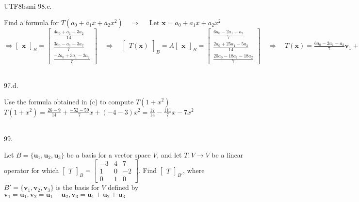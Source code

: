 \documentclass[12pt]{book}
\begin{document}
\begin{CJK}{UTF8}{bsmi}
98.c. \begin{minipage}[t]{\dimexpr\linewidth-2em}
Find a formula for $T(a_0+a_1x+a_2x^2)\quad\Rightarrow\quad$ Let $\textbf{x}=a_0+a_1x+a_2x^2$ \\
$\Rightarrow\begin{bmatrix}
\textbf{x}
\end{bmatrix}_B=\begin{bmatrix}
\frac{4a_0+a_1-3a_2}{14} \\
\frac{3a_0-a_1+3a_2}{7} \\
\frac{-2a_0+3a_1-2a_2}{7}
\end{bmatrix}\quad\Rightarrow\quad\begin{bmatrix}
T(\textbf{x})
\end{bmatrix}_B=A\begin{bmatrix}
\textbf{x}
\end{bmatrix}_B=\begin{bmatrix}
\frac{6a_0-2a_1-a_2}{7} \\
\frac{2a_0+25a_1-5a_2}{14} \\
\frac{20a_0-18a_1-18a_2}{7}
\end{bmatrix}\quad\Rightarrow\quad T(\textbf{x})=\frac{6a_0-2a_1-a_2}{7}\textbf{v}_1+\frac{2a_0+25a_1-5a_2}{14}\textbf{v}_2+\frac{20a_0-18a_1-18a_2}{7}\textbf{v}_3=\frac{26a_0+17a_1-9a_2}{14}+\frac{-52a_0+85a_1-59a_2}{7}x+(-4a_0+7a_1-3a_2)x^2$
\end{minipage}\\

97.d. \begin{minipage}[t]{\dimexpr\linewidth-2em}
Use the formula obtained in (c) to compute $T(1+x^2)$ \\
$T(1+x^2)=\frac{26-9}{14}+\frac{-52-59}{7}x+(-4-3)x^2=\frac{17}{14}-\frac{111}{7}x-7x^2$
\end{minipage}\\

99. \begin{minipage}[t]{\dimexpr\linewidth-2em}
Let $B=\{\textbf{u}_1, \textbf{u}_2, \textbf{u}_3\}$ be a basis for a vector space $V$, and let $T:V\rightarrow V$ be a linear operator for which $\begin{bmatrix}
T
\end{bmatrix}_B=\begin{bmatrix}
-3&4&7\\
1&0&-2\\
0&1&0
\end{bmatrix}$. Find  $\begin{bmatrix}
T
\end{bmatrix}_{B'}$, where $B'=\{\textbf{v}_1, \textbf{v}_2, \textbf{v}_3\}$ is the basis for $V$ defined by \\
$\textbf{v}_1=\textbf{u}_1, \textbf{v}_2=\textbf{u}_1+\textbf{u}_2, \textbf{v}_3=\textbf{u}_1+\textbf{u}_2+\textbf{u}_3$
\end{minipage}\\


\end{CJK}
\end{document}
